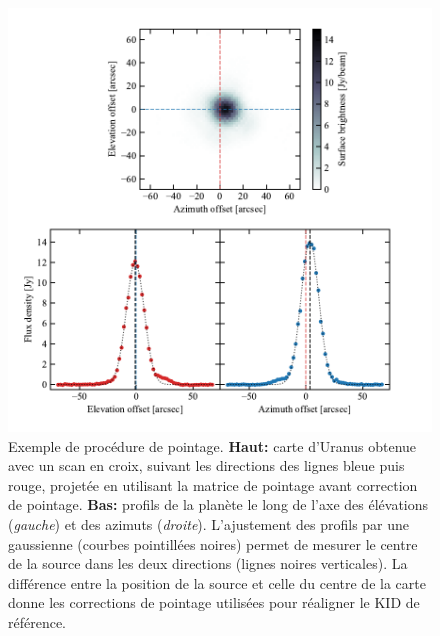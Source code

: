 \begin{figure}[t]
    \centering
    \includegraphics[width=.8\linewidth]{Figures/Chap_nk/pointing.pdf}
    \caption{
        Exemple de procédure de pointage.
        \textbf{Haut:} carte d'Uranus obtenue avec un scan en croix, suivant les directions des lignes bleue puis rouge, projetée en utilisant la matrice de pointage avant correction de pointage.
        \textbf{Bas:} profils de la planète le long de l'axe des élévations (\textit{gauche}) et des azimuts (\textit{droite}).
        L'ajustement des profils par une gaussienne (courbes pointillées noires) permet de mesurer le centre de la source dans les deux directions (lignes noires verticales).
        La différence entre la position de la source et celle du centre de la carte donne les corrections de pointage utilisées pour réaligner le KID de référence.
    }
    \label{fig:nk_pointing}
\end{figure}


